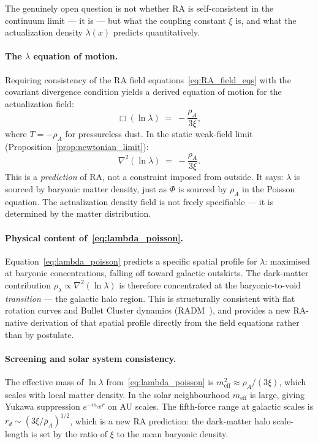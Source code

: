 \documentclass[11pt,a4paper]{article}
\theoremstyle{plain}
\theoremstyle{definition}
\theoremstyle{remark}
\begin{document}
\begin{description}
The genuinely open question is not whether RA is self-consistent in the continuum
limit --- it is --- but what the coupling constant $\xi$ is, and what the
actualization density $\lambda(x)$ predicts quantitatively.

\paragraph{The $\lambda$ equation of motion.}
Requiring consistency of the RA field equations~\eqref{eq:RA_field_eqs} with
the covariant divergence condition yields a derived equation of motion for the
actualization field:
\begin{equation}
  \Box(\ln\lambda) \;=\; -\frac{\rho_A}{3\xi},
  \label{eq:lambda_eom}
\end{equation}
where $T = -\rho_A$ for pressureless dust. In the static weak-field limit
(Proposition~\ref{prop:newtonian_limit}):
\begin{equation}
  \nabla^2(\ln\lambda) \;=\; -\frac{\rho_A}{3\xi}.
  \label{eq:lambda_poisson}
\end{equation}
This is a \emph{prediction} of RA, not a constraint imposed from outside.
It says: $\lambda$ is sourced by baryonic matter density, just as $\Phi$
is sourced by $\rho_A$ in the Poisson equation. The actualization density
field is not freely specifiable --- it is determined by the matter distribution.

\paragraph{Physical content of~\eqref{eq:lambda_poisson}.}
Equation~\eqref{eq:lambda_poisson} predicts a specific spatial profile for $\lambda$:
maximised at baryonic concentrations, falling off toward galactic outskirts.
The dark-matter contribution $\rho_\lambda \propto \nabla^2(\ln\lambda)$ is therefore
concentrated at the baryonic-to-void \emph{transition} --- the galactic halo region.
This is structurally consistent with flat rotation curves and Bullet Cluster dynamics
(RADM~\citep{Sandeman2026RADM}), and provides a new RA-native derivation of
that spatial profile directly from the field equations rather than by postulate.

\paragraph{Screening and solar system consistency.}
The effective mass of $\ln\lambda$ from~\eqref{eq:lambda_poisson} is
$m_{\mathrm{eff}}^2 \approx \rho_A/(3\xi)$, which scales with local matter density.
In the solar neighbourhood $m_{\mathrm{eff}}$ is large, giving Yukawa suppression
$e^{-m_{\mathrm{eff}} r}$ on AU scales. The fifth-force range at galactic scales
is $r_d \sim (3\xi/\bar\rho_A)^{1/2}$, which is a new RA prediction: the
dark-matter halo scale-length is set by the ratio of $\xi$ to the mean baryonic
density.


\end{description}
\end{document}
